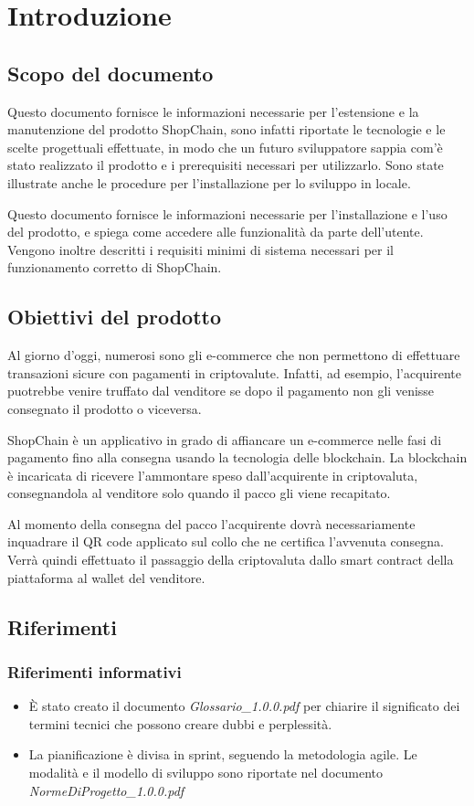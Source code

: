 \section{Introduzione}
\subsection{Scopo del documento}
Questo documento fornisce le informazioni necessarie per l'estensione e la manutenzione del prodotto ShopChain, sono infatti riportate le tecnologie e le scelte progettuali effettuate, in modo che un futuro sviluppatore sappia com'è stato realizzato il prodotto e i prerequisiti necessari per utilizzarlo.
Sono state illustrate anche le procedure per l’installazione per lo sviluppo in locale.

Questo documento fornisce le informazioni necessarie per l'installazione e l'uso del prodotto, e spiega come accedere alle funzionalità da parte dell'utente. Vengono inoltre descritti i requisiti minimi di sistema necessari per il funzionamento corretto di ShopChain.

\subsection{Obiettivi del prodotto}

Al giorno d’oggi, numerosi sono gli e-commerce che non permettono di effettuare transazioni sicure con pagamenti in criptovalute. Infatti, ad esempio, l’acquirente puotrebbe venire truffato dal venditore se dopo il pagamento non gli venisse consegnato il prodotto o viceversa. 

ShopChain è un applicativo in grado di affiancare un e-commerce nelle fasi di pagamento fino alla consegna usando la tecnologia delle blockchain. La blockchain è incaricata di ricevere l’ammontare speso dall’acquirente in criptovaluta, consegnandola al venditore solo quando il pacco gli viene recapitato. 

 Al momento della consegna del pacco l’acquirente dovrà necessariamente inquadrare il QR code applicato sul collo che ne certifica l’avvenuta consegna. Verrà quindi effettuato il passaggio della criptovaluta dallo smart contract della piattaforma al wallet del venditore. 
 
 \pagebreak
 \subsection{Riferimenti}
 
 \subsubsection{Riferimenti informativi}
 \begin{itemize}
     \item  È stato creato il documento \textit{Glossario\_1.0.0.pdf} per chiarire il significato dei termini tecnici che possono creare dubbi e perplessità. 
     \item  La pianificazione è divisa in sprint, seguendo la metodologia agile. Le modalità e il modello di sviluppo sono riportate nel documento \textit{NormeDiProgetto\_1.0.0.pdf}
 \end{itemize}